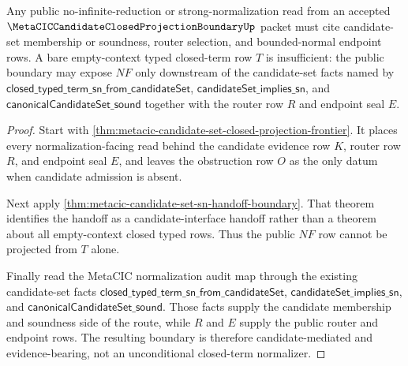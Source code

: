 \begin{theorem}
\label{thm:metacic-candidate-set-public-boundary}
Any public no-infinite-reduction or strong-normalization read from an accepted $\MetaCICCandidateClosedProjectionBoundaryUp$ packet must cite candidate-set membership or soundness, router selection, and bounded-normal endpoint rows. A bare empty-context typed closed-term row $T$ is insufficient: the public boundary may expose $NF$ only downstream of the candidate-set facts named by $\mathsf{closed\_typed\_term\_sn\_from\_candidateSet}$, $\mathsf{candidateSet\_implies\_sn}$, and $\mathsf{canonicalCandidateSet\_sound}$ together with the router row $R$ and endpoint seal $E$.
\end{theorem}
\begin{proof}
Start with \autoref{thm:metacic-candidate-set-closed-projection-frontier}. It places every normalization-facing read behind the candidate evidence row $K$, router row $R$, and endpoint seal $E$, and leaves the obstruction row $O$ as the only datum when candidate admission is absent.

Next apply \autoref{thm:metacic-candidate-set-sn-handoff-boundary}. That theorem identifies the handoff as a candidate-interface handoff rather than a theorem about all empty-context closed typed rows. Thus the public $NF$ row cannot be projected from $T$ alone.

Finally read the MetaCIC normalization audit map through the existing candidate-set facts $\mathsf{closed\_typed\_term\_sn\_from\_candidateSet}$, $\mathsf{candidateSet\_implies\_sn}$, and $\mathsf{canonicalCandidateSet\_sound}$. Those facts supply the candidate membership and soundness side of the route, while $R$ and $E$ supply the public router and endpoint rows. The resulting boundary is therefore candidate-mediated and evidence-bearing, not an unconditional closed-term normalizer.
\end{proof}



